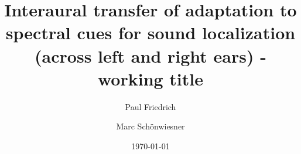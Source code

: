 \documentclass[preprint]{JASA}
\begin{document}
\title[JASA/Sample JASA Article]{Interaural transfer of adaptation to spectral cues for sound localization (across left and right ears) - working title}

\author{Paul Friedrich}

\author{Marc Schönwiesner}


\date{\today}

\begin{abstract}

\end{abstract}

\maketitle












\end{document}
